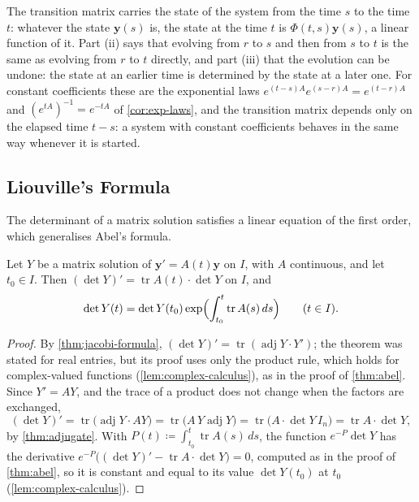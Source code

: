 The transition matrix carries the state of the system from the time $s$ to the time $t$: whatever the state $\mathbf y(s)$ is, the state at the time $t$ is $\Phi(t,s)\mathbf y(s)$, a linear function of it. Part (ii) says that evolving from $r$ to $s$ and then from $s$ to $t$ is the same as evolving from $r$ to $t$ directly, and part (iii) that the evolution can be undone: the state at an earlier time is determined by the state at a later one. For constant coefficients these are the exponential laws $e^{(t-s)A}e^{(s-r)A}=e^{(t-r)A}$ and $(e^{tA})^{-1}=e^{-tA}$ of \cref{cor:exp-laws}, and the transition matrix depends only on the elapsed time $t-s$: a system with constant coefficients behaves in the same way whenever it is started.

\subsection{Liouville's Formula}

The determinant of a matrix solution satisfies a linear equation of the first order, which generalises Abel's formula.

\begin{theorem}
\label{thm:liouville-formula}
Let $Y$ be a matrix solution of $\mathbf y'=A(t)\mathbf y$ on $I$, with $A$ continuous, and let $t_0\in I$. Then $(\det Y)'=\operatorname{tr}A(t)\cdot\det Y$ on $I$, and
\[
\det Y(t)=\det Y(t_0)\exp\Bigl(\int_{t_0}^t\operatorname{tr}A(s)\,ds\Bigr)\qquad(t\in I).
\]
\end{theorem}

\begin{proof}
By \cref{thm:jacobi-formula}, $(\det Y)'=\operatorname{tr}(\operatorname{adj}Y\cdot Y')$; the theorem was stated for real entries, but its proof uses only the product rule, which holds for complex-valued functions (\cref{lem:complex-calculus}), as in the proof of \cref{thm:abel}. Since $Y'=AY$, and the trace of a product does not change when the factors are exchanged,
\[
(\det Y)'=\operatorname{tr}\bigl(\operatorname{adj}Y\cdot AY\bigr)=\operatorname{tr}\bigl(A\,Y\operatorname{adj}Y\bigr)=\operatorname{tr}\bigl(A\cdot\det Y\,I_n\bigr)=\operatorname{tr}A\cdot\det Y ,
\]
by \cref{thm:adjugate}. With $P(t)\coloneqq\int_{t_0}^t\operatorname{tr}A(s)\,ds$, the function $e^{-P}\det Y$ has the derivative $e^{-P}\bigl((\det Y)'-\operatorname{tr}A\cdot\det Y\bigr)=0$, computed as in the proof of \cref{thm:abel}, so it is constant and equal to its value $\det Y(t_0)$ at $t_0$ (\cref{lem:complex-calculus}).
\end{proof}

